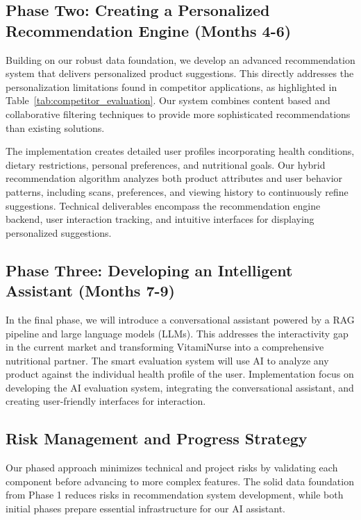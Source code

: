 \subsection{Phase Two: Creating a Personalized Recommendation Engine (Months 4-6)}

Building on our robust data foundation, we develop an advanced recommendation system that delivers personalized product suggestions. 
This directly addresses the personalization limitations found in competitor applications, as highlighted in Table~\ref{tab:competitor_evaluation}. 
Our system combines content based and collaborative filtering techniques to provide more sophisticated recommendations than existing solutions.

The implementation creates detailed user profiles incorporating health conditions, dietary restrictions, personal preferences, and nutritional goals. Our hybrid recommendation algorithm analyzes both product attributes and user behavior patterns, including scans, preferences, and viewing history to continuously refine suggestions. Technical deliverables encompass the recommendation engine backend, user interaction tracking, and intuitive interfaces for displaying personalized suggestions.

\subsection{Phase Three: Developing an Intelligent Assistant (Months 7-9)}

In the final phase, we will introduce a conversational assistant powered by a RAG pipeline and large language models (LLMs). 
This addresses the interactivity gap in the current market and transforming VitamiNurse into a comprehensive nutritional partner. The smart evaluation system will use AI to analyze any product against the individual health profile of the user. 
Implementation focus on developing the AI evaluation system, integrating the conversational assistant, and creating user-friendly interfaces for interaction.


\subsection{Risk Management and Progress Strategy}

Our phased approach minimizes technical and project risks by validating each component before advancing to more complex features. The solid data foundation from Phase 1 reduces risks in recommendation system development, while both initial phases prepare essential infrastructure for our AI assistant. 

